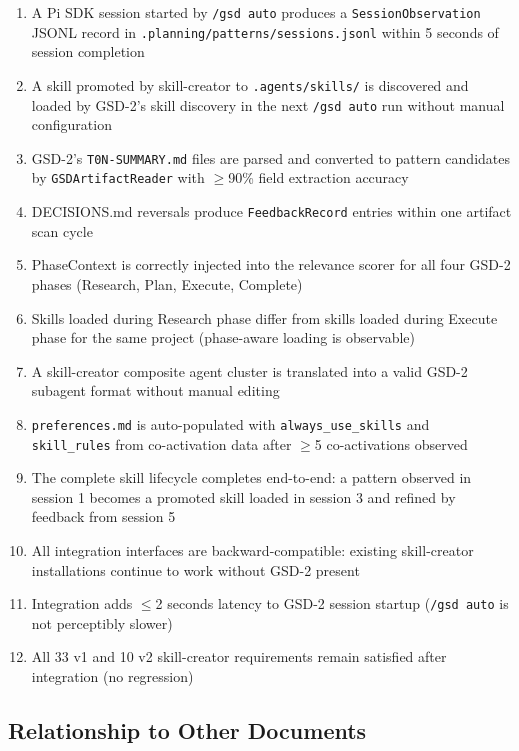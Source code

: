 \documentclass[11pt,letterpaper]{article}
\begin{document}
\begin{enumerate}
  \item A Pi SDK session started by \texttt{/gsd auto} produces a \texttt{SessionObservation} JSONL record in \texttt{.planning/patterns/sessions.jsonl} within 5 seconds of session completion
  \item A skill promoted by skill-creator to \texttt{.agents/skills/} is discovered and loaded by GSD-2's skill discovery in the next \texttt{/gsd auto} run without manual configuration
  \item GSD-2's \texttt{T0N-SUMMARY.md} files are parsed and converted to pattern candidates by \texttt{GSDArtifactReader} with $\geq$90\% field extraction accuracy
  \item DECISIONS.md reversals produce \texttt{FeedbackRecord} entries within one artifact scan cycle
  \item PhaseContext is correctly injected into the relevance scorer for all four GSD-2 phases (Research, Plan, Execute, Complete)
  \item Skills loaded during Research phase differ from skills loaded during Execute phase for the same project (phase-aware loading is observable)
  \item A skill-creator composite agent cluster is translated into a valid GSD-2 subagent format without manual editing
  \item \texttt{preferences.md} is auto-populated with \texttt{always\_use\_skills} and \texttt{skill\_rules} from co-activation data after $\geq$5 co-activations observed
  \item The complete skill lifecycle completes end-to-end: a pattern observed in session 1 becomes a promoted skill loaded in session 3 and refined by feedback from session 5
  \item All integration interfaces are backward-compatible: existing skill-creator installations continue to work without GSD-2 present
  \item Integration adds $\leq$2 seconds latency to GSD-2 session startup (\texttt{/gsd auto} is not perceptibly slower)
  \item All 33 v1 and 10 v2 skill-creator requirements remain satisfied after integration (no regression)
\end{enumerate}

\subsection{Relationship to Other Documents}
\end{document}
